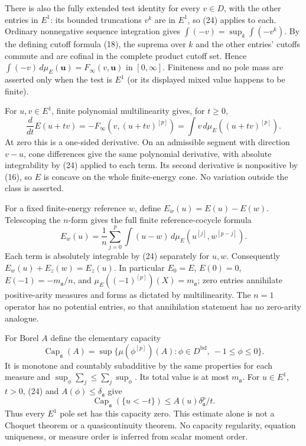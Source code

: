 \documentclass[
  11pt,
]{article}
\begin{document}
There is also the fully extended test identity for every \(v\in D\),
with the other entries in \(E^1\): its bounded truncations \(v^k\) are
in \(E^1\), so (24) applies to each. Ordinary nonnegative sequence
integration gives \(\int(-v)=\sup_k\int(-v^k)\). By the defining cutoff
formula (18), the suprema over \(k\) and the other entries' cutoffs
commute and are cofinal in the complete product cutoff set. Hence
\(\int(-v)\,d\mu_E(\boldsymbol u)=F_\infty(v,\boldsymbol u)\) in
\([0,\infty]\). Finiteness and no pole mass are asserted only when the
test is \(E^1\) (or its displayed mixed value happens to be finite).

For \(u,v\in E^1\), finite polynomial multilinearity gives, for
\(t\ge0\),
\[\frac{d}{dt}E(u+tv)=-F_\infty(v,(u+tv)^{[p]})=\int v\,d\mu_E((u+tv)^{[p]}).\tag{26}\]
At zero this is a one-sided derivative. On an admissible segment with
direction \(v-u\), cone differences give the same polynomial derivative,
with absolute integrability by (24) applied to each term. Its second
derivative is nonpositive by (16), so \(E\) is concave on the whole
finite-energy cone. No variation outside the class is asserted.

For a fixed finite-energy reference \(w\), define \(E_w(u)=E(u)-E(w)\).
Telescoping the \(n\)-form gives the full finite reference-cocycle
formula
\[E_w(u)=\frac1n\sum_{j=0}^{p}\int(u-w)\,d\mu_E(u^{[j]},w^{[p-j]}).\tag{27}\]
Each term is absolutely integrable by (24) separately for \(u,w\).
Consequently \(E_w(u)+E_z(w)=E_z(u)\). In particular \(E_0=E\),
\(E(0)=0\), \(E(-1)=-m_{\mathfrak a}/n\), and
\(\mu_E((-1)^{[p]})(X)=m_{\mathfrak a}\); zero entries annihilate
positive-arity measures and forms as dictated by multilinearity. The
\(n=1\) operator has no potential entries, so that annihilation
statement has no zero-arity analogue.

For Borel \(A\) define the elementary capacity
\[\operatorname{Cap}_{\mathfrak a}(A)=\sup\{\mu(\phi^{[p]})(A):\phi\in D^{\mathrm{bd}},\ -1\le\phi\le0\}.\]
It is monotone and countably subadditive by the same properties for each
measure and \(\sup_\phi\sum_j\le\sum_j\sup_\phi\). Its total value is at
most \(m_{\mathfrak a}\). For \(u\in E^1\), \(t>0\), (24) and
\(A(\phi)\le\delta_{\mathfrak a}\) give
\[\operatorname{Cap}_{\mathfrak a}(\{u<-t\})\le A(u)\delta_{\mathfrak a}^{p}/t.\tag{28}\]
Thus every \(E^1\) pole set has this capacity zero. This estimate alone
is not a Choquet theorem or a quasicontinuity theorem. No capacity
regularity, equation uniqueness, or measure order is inferred from
scalar moment order.
\end{document}
